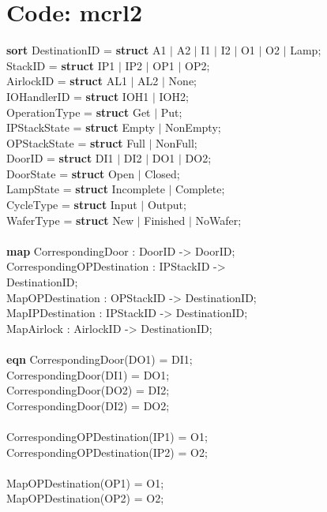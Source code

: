 \documentclass[a4paper,12pt]{article}
\begin{document}
\section{Code: mcrl2}
\textbf{sort} DestinationID = \textbf{struct} A1 $|$ A2 $|$ I1 $|$ I2 $|$ O1 $|$ O2 $|$ Lamp;
\\		  StackID = \textbf{struct} IP1 $|$ IP2 $|$ OP1 $|$ OP2;
\\		  AirlockID = \textbf{struct} AL1 $|$ AL2 $|$ None;
\\     IOHandlerID = \textbf{struct} IOH1 $|$ IOH2;
\\		  OperationType = \textbf{struct} Get $|$ Put;
\\		  IPStackState = \textbf{struct} Empty $|$ NonEmpty;
\\		  OPStackState = \textbf{struct} Full $|$ NonFull;
\\	    DoorID = \textbf{struct} DI1 $|$ DI2 $|$ DO1 $|$ DO2;		
\\		  DoorState = \textbf{struct} Open $|$ Closed;
\\			LampState = \textbf{struct} Incomplete $|$ Complete;
\\		  CycleType = \textbf{struct} Input $|$ Output;
\\		  WaferType = \textbf{struct} New $|$ Finished $|$ NoWafer;
\\
\\\textbf{map} CorrespondingDoor : DoorID -> DoorID;
\\	  CorrespondingOPDestination : IPStackID -> \\DestinationID;		
\\	  MapOPDestination : OPStackID -> DestinationID;
\\		MapIPDestination : IPStackID -> DestinationID;
\\		MapAirlock : AirlockID -> DestinationID;
\\
\\ \textbf{eqn} CorrespondingDoor(DO1) = DI1;
\\		CorrespondingDoor(DI1) = DO1;
\\		CorrespondingDoor(DO2) = DI2;
\\		CorrespondingDoor(DI2) = DO2;
\\
\\		CorrespondingOPDestination(IP1) = O1;
\\		CorrespondingOPDestination(IP2) = O2;
\\
\\		MapOPDestination(OP1) = O1;
\\		MapOPDestination(OP2) = O2;
\end{document}

